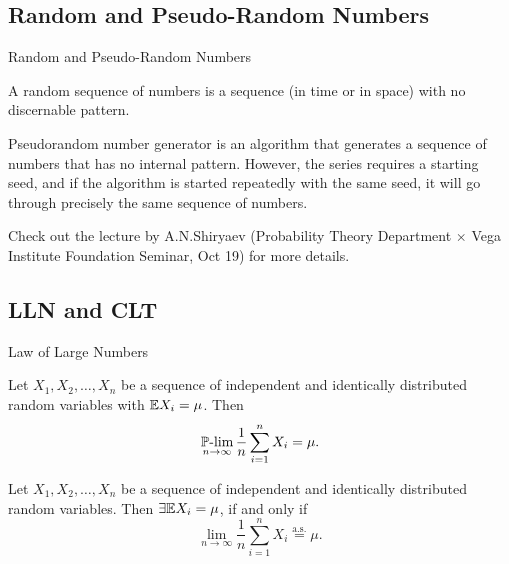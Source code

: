 \subsection{Random and Pseudo-Random Numbers}
    \begin{frame}{Random and Pseudo-Random Numbers}
        \begin{definition}
            A random sequence of numbers is a sequence (in time or in space) with no discernable pattern.
        \end{definition}
        \begin{definition}
            Pseudorandom number generator is an algorithm that generates a sequence of numbers that has no internal pattern. However, the series requires a starting seed, and if the algorithm is started repeatedly with the same seed, it will go through precisely the same sequence of numbers.
        \end{definition}

        Check out the lecture by A.N.Shiryaev (Probability Theory Department $\times$ Vega Institute Foundation Seminar, Oct 19) for more details.
    \end{frame}

\subsection{LLN and CLT}
    \begin{frame}{Law of Large Numbers}
        \begin{theorem}[Khinchin]
            Let $X_1, X_2, \dots, X_n$ be a sequence of independent and identically distributed random variables with $\mathbb{E} X_i = \mu$. Then
            \begin{equation}
                \operatorname*{\operatorname{\mathbb{P}-lim}}_{n \to \infty} \frac{1}{n} \sum_{i=1}^n X_i = \mu.
            \end{equation}
        \end{theorem}
        \begin{theorem}[Kolmogorov]
            Let $X_1, X_2, \dots, X_n$ be a sequence of independent and identically distributed random variables. Then $\exists \mathbb{E} X_i = \mu$, if and only if
            \begin{equation}
                \lim_{n \to \infty} \frac{1}{n} \sum_{i=1}^n X_i \overset{\text{a.s.}}{=} \mu.
            \end{equation}
        \end{theorem}
    \end{frame}


